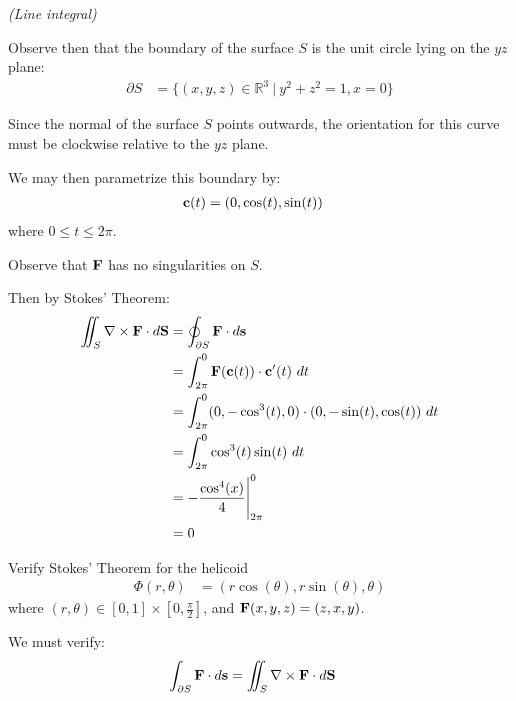 \begin{solution}
    \textit{(Line integral)}
    
    Observe then that the boundary of the surface \(S\) is the unit circle lying on the \(yz\) plane:
    \begin{align}
        \partial S &= \{(x, y, z) \in \mathbb{R}^3 \ | \ y^2 + z^2 = 1, x = 0\}
    \end{align}

    Since the normal of the surface \(S\) points outwards, the orientation for this curve must be clockwise relative to the \(yz\) plane.

    We may then parametrize this boundary by:
    \begin{align}
        \vb{c}(t) &= (0, \cos(t), \sin(t))
    \end{align}
    where \(0 \leq t \leq 2\pi\).
    
    Observe that \(\vb{F}\) has no singularities on \(S\).
    
    Then by Stokes' Theorem:
    \begin{align*}
        \iint_S \nabla \times \vb{F} \cdot d \vb{S} &= \oint_{\partial S} \vb{F} \cdot d\vb{s} \\
        &= \int_{2\pi}^{0} \vb{F}(\vb{c}(t)) \cdot \vb{c}'(t) \ dt \\
        &= \int_{2\pi}^{0} (0, -\cos^3(t), 0) \cdot (0, -\sin(t), \cos(t)) \ dt \\
        &= \int_{2\pi}^{0} \cos^3(t)\sin(t) \ dt \\
        &= - \frac{\cos^4(x)}{4} \Biggr|_{2\pi}^{0} \\
        &= 0
    \end{align*}
\end{solution}

\begin{tcolorbox}[
        title={Problem 29},
        valign=center,
        nobeforeafter,
        colframe=gray!95!black
    ]
    Verify Stokes' Theorem for the helicoid
    \begin{align}
        \Phi(r, \theta) &= (r \cos(\theta), r\sin(\theta), \theta)
    \end{align}
    where \((r, \theta) \in [0, 1] \times \left[0, \frac{\pi}{2}\right]\), and \(\vb{F}(x, y, z) = (z, x, y)\).
\end{tcolorbox}

We must verify:
\begin{align}
    \int_{\partial S} \vb{F} \cdot d\vb{s} &= \iint_S \nabla \times \vb{F} \cdot d\vb{S}
\end{align}

